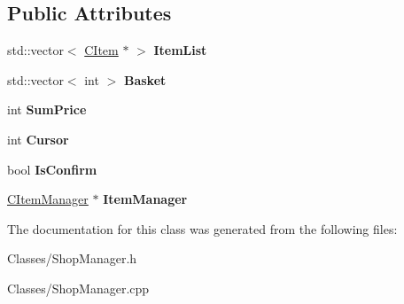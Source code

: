 \subsection*{Public Attributes}
\begin{DoxyCompactItemize}
\item 
std\+::vector$<$ \hyperlink{class_c_item}{C\+Item} $\ast$ $>$ {\bfseries Item\+List}\hypertarget{class_c_shop_menu_af2770e04cbb5c34641a5dd73f81fe33d}{}\label{class_c_shop_menu_af2770e04cbb5c34641a5dd73f81fe33d}

\item 
std\+::vector$<$ int $>$ {\bfseries Basket}\hypertarget{class_c_shop_menu_a1094513959ee729ca1afadc5aeda73ff}{}\label{class_c_shop_menu_a1094513959ee729ca1afadc5aeda73ff}

\item 
int {\bfseries Sum\+Price}\hypertarget{class_c_shop_menu_a5dba1be33be60e2dafa22f37cfa72c73}{}\label{class_c_shop_menu_a5dba1be33be60e2dafa22f37cfa72c73}

\item 
int {\bfseries Cursor}\hypertarget{class_c_shop_menu_a509758e399dbda43cc718b6fc7c83e9c}{}\label{class_c_shop_menu_a509758e399dbda43cc718b6fc7c83e9c}

\item 
bool {\bfseries Is\+Confirm}\hypertarget{class_c_shop_menu_a2d644595fcab08f8bc5d51e5a383fef3}{}\label{class_c_shop_menu_a2d644595fcab08f8bc5d51e5a383fef3}

\item 
\hyperlink{class_c_item_manager}{C\+Item\+Manager} $\ast$ {\bfseries Item\+Manager}\hypertarget{class_c_shop_menu_a3c6b837edc5c90e2f9e647489ab48e35}{}\label{class_c_shop_menu_a3c6b837edc5c90e2f9e647489ab48e35}

\end{DoxyCompactItemize}


The documentation for this class was generated from the following files\+:\begin{DoxyCompactItemize}
\item 
Classes/Shop\+Manager.\+h\item 
Classes/Shop\+Manager.\+cpp\end{DoxyCompactItemize}
